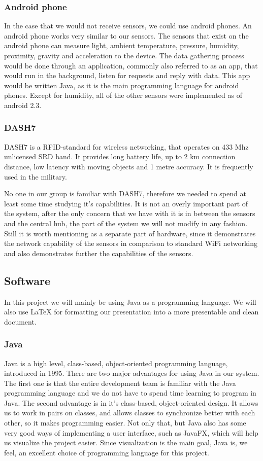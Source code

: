 \documentclass[../document.tex]{subfiles}
\begin{document}
\subsubsection{Android phone}
In the case that we would not receive sensors, we could use android phones. An android phone works very similar to our sensors. The sensors that exist on the android phone can measure light, ambient temperature, pressure, humidity, proximity, gravity and acceleration to the device. The data gathering process would be done through an application, commonly also referred to as an app, that would run in the background, listen for requests and reply with data. This app would be written Java, as it is the main programming language for android phones. Except for humidity, all of the other sensors were implemented as of android 2.3.

\subsubsection{DASH7}
DASH7 is a RFID-standard for wireless networking, that operates on 433 Mhz unlicensed SRD band. It provides long battery life, up to 2 km connection distance, low latency with moving objects and 1 metre accuracy. It is frequently used in the military.

No one in our group is familiar with DASH7, therefore we needed to spend at least some time studying it’s capabilities. It is not an overly important part of the system, after the only concern that we have with it is in between the sensors and the central hub, the part of the system we will not modify in any fashion. Still it is worth mentioning as a separate part of hardware, since it demonstrates the network capability of the sensors in comparison to standard WiFi networking and also demonstrates further the capabilities of the sensors.

\subsection{Software}

In this project we will mainly be using Java as a programming language. We will also use LaTeX for formatting our presentation into a more presentable and clean document.

\subsubsection{Java}
Java is a high level, class-based, object-oriented programming language, introduced in 1995. There are two major advantages for using Java in our system. The first one is that the entire development team is familiar with the Java programming language and we do not have to spend time learning to program in Java. The second advantage is in it’s class-based, object-oriented design. It allows us to work in pairs on classes, and allows classes to synchronize better with each other, so it makes programming easier. Not only that, but Java also has some very good ways of implementing a user interface, such as JavaFX, which will help us visualize the project easier. Since visualization is the main goal, Java is, we feel, an excellent choice of programming language for this project.
\end{document}
